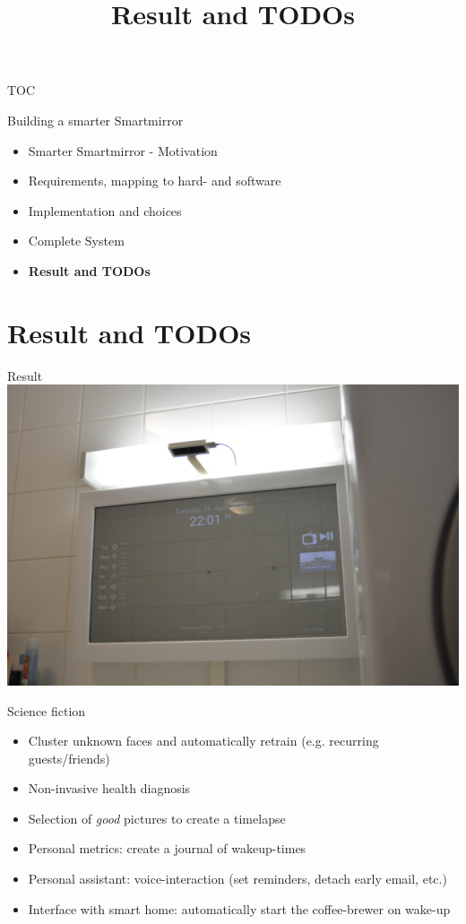 \documentclass[xcolor=svgnames,handout,aspectratio=169]{beamer}
\begin{document}
\begin{frame}
  {TOC}

  Building a smarter Smartmirror

  \begin{itemize}
  \item Smarter Smartmirror - Motivation
  \item Requirements, mapping to hard- and software
  \item Implementation and choices
  \item Complete System
  \item \textbf{Result and TODOs}
  \end{itemize}
\end{frame}


\section{Result and TODOs}
\title[Result and TODOs]{Result and TODOs}

\begin{frame}
	{Result}
	\center
	\includegraphics[width=.7\linewidth]{images/mirror_real}
\end{frame}

\begin{frame}
	{Science fiction}
	
	\begin{itemize}
		\item Cluster unknown faces and automatically retrain (e.g. recurring guests/friends)
		\item Non-invasive health diagnosis
		\item Selection of \emph{good} pictures to create a timelapse
		\item Personal metrics: create a journal of wakeup-times
		\item Personal assistant: voice-interaction (set reminders, detach early email, etc.)
		\item Interface with smart home: automatically start the coffee-brewer on wake-up
	\end{itemize}
\end{frame}
\end{document}
